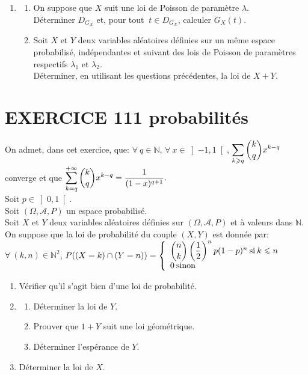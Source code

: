 \documentclass[10pt,oneside]{article}
\begin{document}
\begin{flushleft}
\begin{enumerate}
\begin{enumerate}
Pour tout réel $t$ fixé de $\left[-1,1 \right]$, exprimer $G_X(t)$ sous forme d'une espérance.\:\:\:\:
\item
Soit $k\in\mathbb{N}$.
Exprimer, en justifiant la réponse, $P(X=k)$ en fonction de  $G_X^{(k)}(0)$.\:\:\:\:

\end{enumerate}
\item 
\begin{enumerate}
\item
 On suppose que $X$ suit une loi de Poisson de paramètre $\lambda$.\\
 Déterminer $D_{G_X}$ et, pour tout $\:t\in D_{G_X}$, calculer $G_X(t)$.\:\:\:\:
 

 \item
 Soit $X$ et $Y$ deux variables aléatoires définies sur un même espace probabilisé, indépendantes  et suivant des lois de Poisson de paramètres respectifs $\lambda_1$ et $\lambda_2$.\\
 Déterminer, en utilisant les questions précédentes, la loi de $X+Y$.\:\:\:\:
 \end{enumerate}
\end{enumerate}

\section*{EXERCICE 111 \:probabilités}

On admet, dans cet exercice, que:
 $\forall\:q\in \mathbb{N}$, $\forall \:x\in \left] -1,1\right[$, $\displaystyle\sum\limits_{k\geqslant q}^{}\dbinom {k}{q}x^{k-q}$ converge et  que  $\displaystyle\sum\limits_{k=q}^{+\infty}\dbinom{k}{q}x^{k-q}=\dfrac{1}{(1-x)^{q+1}}.$\\
 \bigskip
Soit $p\in \left] 0,1\right[ $.\\
Soit $(\Omega,\mathcal{A},P)$ un espace probabilisé.\\
Soit $X$ et $Y$ deux variables aléatoires définies sur  $(\Omega,\mathcal{A},P)$ et à valeurs dans $\mathbb{N}$.\\
On suppose que la loi de probabilité du  couple $(X,Y)$ est donnée par:\\
\medskip
$\forall\:(k,n)\in\mathbb{N}^2$, $P((X=k)\cap (Y=n))=\left\lbrace \begin{array}{l}
\dbinom{n}{k}\left( \dfrac{1}{2}\right)^np(1-p)^n\:\text{si}\:k\leqslant n\\
0\:\text{sinon} 
\end{array}
\right.$
\begin{enumerate}
\item
Vérifier qu'il s'agit bien d'une loi de probabilité.
\item
\begin{enumerate}
\item
Déterminer la loi de $Y$.
\item
Prouver que $1+Y$ suit une loi géométrique.
\item
Déterminer l'espérance de $Y$.
\end{enumerate}
\item
Déterminer la loi de $X$.



\end{enumerate}
\end{flushleft}
\end{document}
